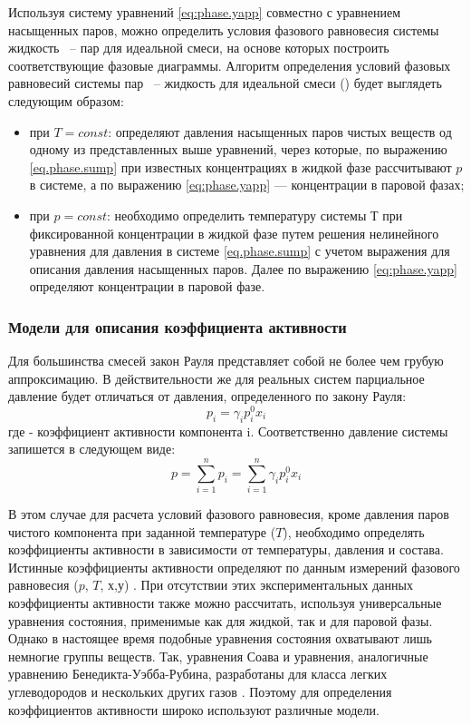 Используя систему уравнений \eqref{eq:phase.yapp} совместно с уравнением насыщенных паров, можно определить условия фазового равновесия системы жидкость ~-- пар для идеальной смеси, на основе которых построить соответствующие фазовые диаграммы. 
Алгоритм определения условий фазовых равновесий системы пар ~-- жидкость для идеальной смеси () будет выглядеть следующим образом:
\begin{itemize}
	\item при $T = const$: определяют давления насыщенных паров чистых веществ од одному из представленных выше уравнений, через которые, по выражению \eqref{eq.phase.sump} при известных концентрациях в жидкой фазе рассчитывают  $p$ в системе, а по выражению  \eqref{eq:phase.yapp} --- концентрации в паровой фазах;
	\item при $p = const$: необходимо определить температуру системы $Т$ при фиксированной концентрации в жидкой фазе путем решения нелинейного уравнения для давления в системе \eqref{eq.phase.sump} с учетом выражения для описания давления насыщенных паров. Далее по выражению \eqref{eq:phase.yapp} определяют концентрации в паровой фазе.
\end{itemize}

\subsubsection*{Модели для описания коэффициента активности}
Для большинства смесей закон Рауля представляет собой не более чем грубую аппроксимацию. В действительности же для реальных систем парциальное давление будет отличаться от давления, определенного по закону Рауля:
\begin{equation}
p_i=\gamma_i p_i^0 x_i
\end{equation}
где  - коэффициент активности компонента i. Соответственно давление системы запишется в следующем виде:
\begin{equation} \label{eq.phase.pressgam}
p=\sum\limits_{i=1}^{n} p_i=\sum\limits_{i=1}^{n} \gamma_i p_i^0 x_i
\end{equation}

В этом случае для расчета условий фазового равновесия, кроме давления паров чистого компонента при заданной температуре ($T$), необходимо определять коэффициенты активности в зависимости от температуры, давления и состава.
Истинные коэффициенты активности определяют по данным измерений фазового равновесия ($p$, $T$, $х$,$ у$) \cite{kogan1,kogan2} . При отсутствии этих экспериментальных данных коэффициенты активности также можно рассчитать, используя универсальные уравнения состояния, применимые как для жидкой, так и для паровой фазы. Однако в настоящее время подобные уравнения состояния охватывают лишь немногие группы веществ. Так, уравнения Соава и уравнения, аналогичные уравнению Бенедикта-Уэбба-Рубина, разработаны для класса легких углеводородов и нескольких других газов \cite{rid1982}. Поэтому для определения коэффициентов активности широко используют различные модели.

